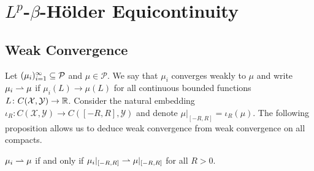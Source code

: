 \documentclass[12pt]{report}
\begin{document}
\chapter{\texorpdfstring{$L^p$-$\beta$}{Lp-beta}-H\"older Equicontinuity}
\label{chap:holder}

\section{Weak Convergence}
Let $(\mu_i)_{i=1}^\infty \subseteq \mathcal{P}$ and $\mu \in \mathcal{P}$.
We say that $\mu_i$ converges weakly to $\mu$ and write $\mu_i \rightharpoonup \mu$ if $\mu_i(L) \to \mu(L)$ for all continuous bounded functions $L\colon C(\mathcal{X}, \mathcal{Y}) \to \mathbb{R}$.
Consider the natural embedding $\iota_R \colon C(\mathcal{X}, \mathcal{Y}) \to C([-R, R], \mathcal{Y})$ and denote $\mu|_{[-R, R]} = \iota_R(\mu)$.
The following proposition allows us to deduce weak convergence from weak convergence on all compacts.

\begin{proposition} \label{prop:weak_convergence_from_compacts}
    $\mu_i \rightharpoonup \mu$ if and only if $\mu_i|_{[-R,R]} \rightharpoonup \mu|_{[-R, R]}$ for all $R > 0$.
\end{proposition}
\end{document}
